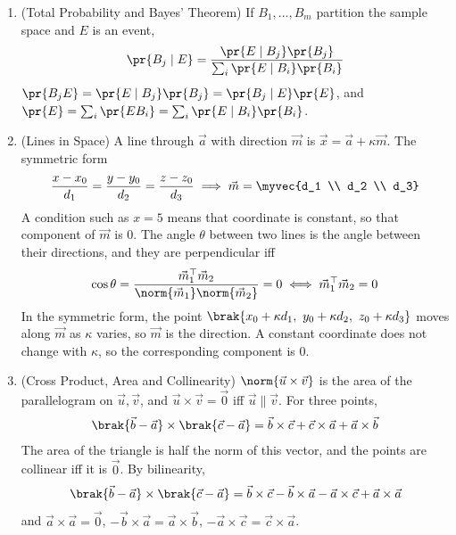 \begin{enumerate}[label=\thesubsection.\arabic*, ref=\thesubsection.\theenumi,itemsep=1.5em]
\item (Total Probability and Bayes' Theorem) If $B_1,\dots,B_m$ partition the sample space and $E$ is an event,
\begin{align}
\pr{B_j\mid E} = \frac{\pr{E\mid B_j}\pr{B_j}}{\sum_{i}\pr{E\mid B_i}\pr{B_i}}
\label{eq:EE26BTECH11218-cb12-bayes}
\end{align}
\solution $\pr{B_jE} = \pr{E\mid B_j}\pr{B_j} = \pr{B_j\mid E}\pr{E}$, and $\pr{E}=\sum_i\pr{EB_i} = \sum_i\pr{E\mid B_i}\pr{B_i}$.

\item (Lines in Space) A line through $\vec{a}$ with direction $\vec{m}$ is $\vec{x}=\vec{a}+\kappa\vec{m}$. The symmetric form
\begin{align}
\frac{x-x_0}{d_1} = \frac{y-y_0}{d_2} = \frac{z-z_0}{d_3} \implies \vec{m} = \myvec{d_1 \\ d_2 \\ d_3}
\label{eq:EE26BTECH11218-cb12-symm}
\end{align}
A condition such as $x=5$ means that coordinate is constant, so that component of $\vec{m}$ is $0$. The angle $\theta$ between two lines is the angle between their directions, and they are perpendicular iff
\begin{align}
\cos\theta = \frac{\vec{m}_1^{\top}\vec{m}_2}{\norm{\vec{m}_1}\norm{\vec{m}_2}} = 0 \iff \vec{m}_1^{\top}\vec{m}_2 = 0
\label{eq:EE26BTECH11218-cb12-perp}
\end{align}
\solution In the symmetric form, the point $\brak{x_0+\kappa d_1,\ y_0+\kappa d_2,\ z_0+\kappa d_3}$ moves along $\vec{m}$ as $\kappa$ varies, so $\vec{m}$ is the direction. A constant coordinate does not change with $\kappa$, so the corresponding component is $0$.

\item (Cross Product, Area and Collinearity) $\norm{\vec{u}\times\vec{v}}$ is the area of the parallelogram on $\vec{u},\vec{v}$, and $\vec{u}\times\vec{v}=\vec{0}$ iff $\vec{u}\parallel\vec{v}$. For three points,
\begin{align}
\brak{\vec{b}-\vec{a}}\times\brak{\vec{c}-\vec{a}} = \vec{b}\times\vec{c}+\vec{c}\times\vec{a}+\vec{a}\times\vec{b}
\label{eq:EE26BTECH11218-cb12-cross}
\end{align}
The area of the triangle is half the norm of this vector, and the points are collinear iff it is $\vec{0}$.
\solution By bilinearity,
\begin{align}
\brak{\vec{b}-\vec{a}}\times\brak{\vec{c}-\vec{a}} = \vec{b}\times\vec{c} - \vec{b}\times\vec{a} - \vec{a}\times\vec{c} + \vec{a}\times\vec{a}
\end{align}
and $\vec{a}\times\vec{a}=\vec{0}$, $-\vec{b}\times\vec{a}=\vec{a}\times\vec{b}$, $-\vec{a}\times\vec{c}=\vec{c}\times\vec{a}$.


\end{enumerate}
